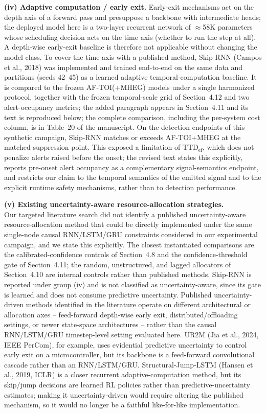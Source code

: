 \documentclass[1p,12pt,authoryear]{elsarticle}
\begin{document}
\vspace{2mm}
\noindent \textbf{(iv) Adaptive computation / early exit.} Early-exit mechanisms act on the depth axis of a forward pass and presuppose a backbone with intermediate heads; the deployed model here is a two-layer recurrent network of $\approx$58K parameters whose scheduling decision acts on the time axis (whether to run the step at all). A depth-wise early-exit baseline is therefore not applicable without changing the model class. To cover the time axis with a published method, Skip-RNN (Campos et al., 2018) was implemented and trained end-to-end on the same data and partitions (seeds 42--45) as a learned adaptive temporal-computation baseline. It is compared to the frozen AF-TOI(+MHEG) models under a single harmonized protocol, together with the frozen temporal-scale grid of Section~4.12 and two alert-occupancy metrics; the added paragraph appears in Section~4.11 and its text is reproduced below; the complete comparison, including the per-system cost column, is in Table~20 of the manuscript. On the detection endpoints of this synthetic campaign, Skip-RNN matches or exceeds AF-TOI+MHEG at the matched-suppression point. This exposed a limitation of $\mathrm{TTD}_{\mathrm{ef}}$, which does not penalize alerts raised before the onset; the revised text states this explicitly, reports pre-onset alert occupancy as a complementary signal-semantics endpoint, and restricts our claim to the temporal semantics of the emitted signal and to the explicit runtime safety mechanisms, rather than to detection performance.

\vspace{2mm}
\noindent \textbf{(v) Existing uncertainty-aware resource-allocation strategies.}\\ Our targeted literature search did not identify a published uncertainty-aware resource-allocation method that could be directly implemented under the same single-node causal RNN/LSTM/GRU constraints considered in our experimental campaign, and we state this explicitly. The closest instantiated comparisons are the calibrated-confidence controls of Section~4.8 and the confidence-threshold gate of Section~4.11; the random, unstructured, and lagged allocators of Section~4.10 are internal controls rather than published methods. Skip-RNN is reported under group (iv) and is not classified as uncertainty-aware, since its gate is learned and does not consume predictive uncertainty. Published uncertainty-driven methods identified in the literature operate on different architectural or allocation axes -- feed-forward depth-wise early exit, distributed/offloading settings, or newer state-space architectures -- rather than the causal RNN/LSTM/GRU timestep-level setting evaluated here. UR2M (Jia et al., 2024, IEEE PerCom), for example, uses evidential predictive uncertainty to control early exit on a microcontroller, but its backbone is a feed-forward convolutional cascade rather than an RNN/LSTM/GRU. Structural-Jump-LSTM (Hansen et al., 2019, ICLR) is a closer recurrent adaptive-computation method, but its skip/jump decisions are learned RL policies rather than predictive-uncertainty estimates; making it uncertainty-driven would require altering the published mechanism, so it would no longer be a faithful like-for-like implementation.
\end{document}
